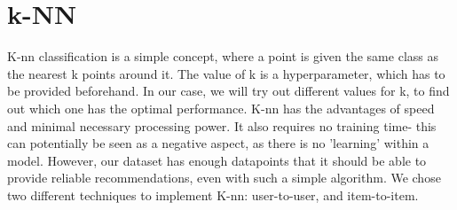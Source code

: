 \documentclass[11pt]{article}
\begin{document}
\section{k-NN}
K-nn classification is a simple concept, where a point is given the same class as the nearest k points around it. The value of k is a hyperparameter, which has to be provided beforehand. In our case, we will try out different values for k, to find out which one has the optimal performance. K-nn has the advantages of speed and minimal necessary processing power. It also requires no training time- this can potentially be seen as a negative aspect, as there is no 'learning' within a model. However, our dataset has enough datapoints that it should be able to provide reliable recommendations, even with such a simple algorithm. We chose two different techniques to implement K-nn: user-to-user, and item-to-item.
\end{document}
